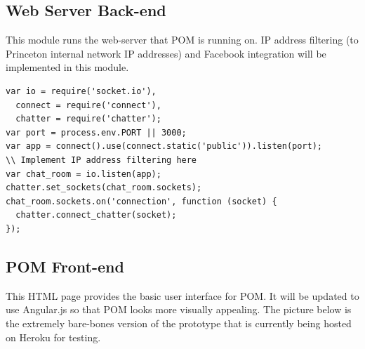 \documentclass{article}
\begin{document}
\subsection{Web Server Back-end}

This module runs the web-server that POM is running on. IP address filtering (to Princeton internal network IP addresses) and Facebook integration will be implemented in this module.

\begin{lstlisting}
var io = require('socket.io'),
  connect = require('connect'),
  chatter = require('chatter');
var port = process.env.PORT || 3000;
var app = connect().use(connect.static('public')).listen(port);
\\ Implement IP address filtering here
var chat_room = io.listen(app);
chatter.set_sockets(chat_room.sockets);
chat_room.sockets.on('connection', function (socket) {
  chatter.connect_chatter(socket);
});
\end{lstlisting}

\subsection{POM Front-end}

This HTML page provides the basic user interface for POM. It will be updated to use Angular.js so that POM looks more visually appealing. The picture below is the extremely bare-bones version of the prototype that is currently being hosted on Heroku for testing. 
\end{document}
